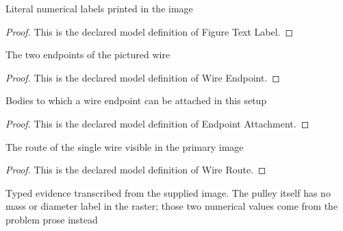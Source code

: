 \begin{definition}
  \label{def:physics:phyx-mini-0778:phyxminiproblems-problemphyxmini0778-figuretextlabel}
  Literal numerical labels printed in the image
\end{definition}
\begin{proof}
  This is the declared model definition of Figure Text Label.
\end{proof}
\begin{definition}
  \label{def:physics:phyx-mini-0778:phyxminiproblems-problemphyxmini0778-wireendpoint}
  The two endpoints of the pictured wire
\end{definition}
\begin{proof}
  This is the declared model definition of Wire Endpoint.
\end{proof}
\begin{definition}
  \label{def:physics:phyx-mini-0778:phyxminiproblems-problemphyxmini0778-endpointattachment}
  Bodies to which a wire endpoint can be attached in this setup
\end{definition}
\begin{proof}
  This is the declared model definition of Endpoint Attachment.
\end{proof}
\begin{definition}
  \label{def:physics:phyx-mini-0778:phyxminiproblems-problemphyxmini0778-wireroute}
  The route of the single wire visible in the primary image
\end{definition}
\begin{proof}
  This is the declared model definition of Wire Route.
\end{proof}
\begin{definition}
  \label{def:physics:phyx-mini-0778:phyxminiproblems-problemphyxmini0778-suppliedpulleyfigure}
  Typed evidence transcribed from the supplied image. The pulley itself has no mass or diameter label in the raster; those two numerical values come from the problem prose instead
\end{definition}
